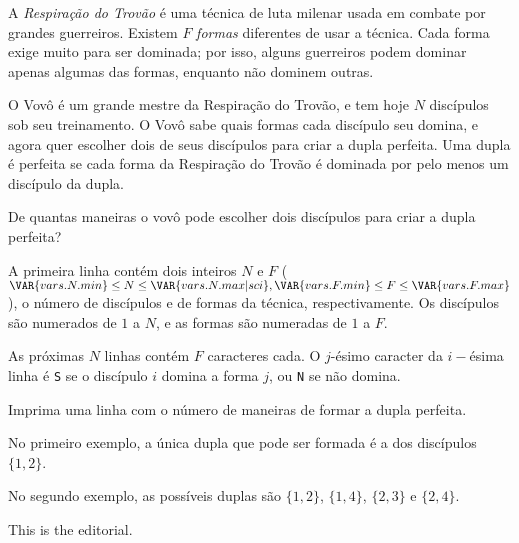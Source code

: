 A \textit{Respiração do Trovão} é uma técnica de luta milenar usada em combate
por grandes guerreiros. Existem $F$ \textit{formas} diferentes de usar a técnica. Cada
forma exige muito para ser dominada; por isso, alguns guerreiros
podem dominar apenas algumas das formas, enquanto não dominem outras.

O Vovô é um grande mestre da Respiração do Trovão, e tem hoje $N$ discípulos sob
seu treinamento. O Vovô sabe quais formas cada discípulo seu domina, e agora quer escolher dois de seus discípulos para criar a dupla perfeita. Uma dupla é perfeita se cada forma da Respiração do Trovão é dominada por
pelo menos um discípulo da dupla.

De quantas maneiras o vovô pode escolher dois discípulos para criar a dupla
perfeita?


A primeira linha contém dois inteiros $N$ e $F$ ($\VAR{vars.N.min} \leq N \leq
\VAR{vars.N.max |sci}, \VAR{vars.F.min} \leq F \leq \VAR{vars.F.max}$),
o número de discípulos e de formas da técnica, respectivamente.
Os discípulos são numerados de $1$ a $N$, e as formas são numeradas de $1$ a
$F$.

As próximas $N$ linhas contém $F$ caracteres cada. O $j$-ésimo caracter da
$i-$ésima linha é \texttt{S} se o discípulo $i$ domina a forma $j$, ou
\texttt{N} se não domina.


Imprima uma linha com o número de maneiras de
formar a dupla perfeita.

No primeiro exemplo, a única dupla que pode ser formada é a dos discípulos
$\{1,2\}$.

No segundo exemplo, as possíveis duplas são
$\{1,2\}$, $\{1,4\}$, $\{2,3\}$ e $\{2,4\}$.


This is the editorial.
